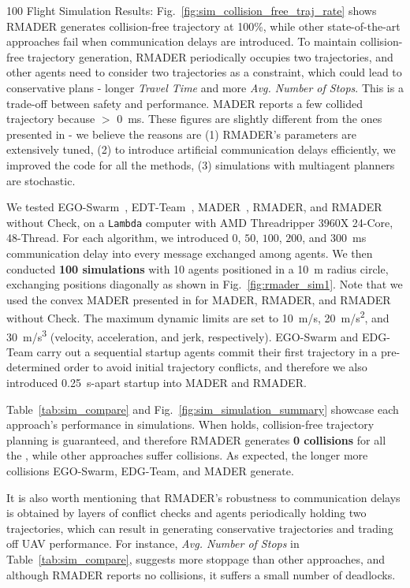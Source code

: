 100 Flight Simulation Results: Fig.~\ref{fig:sim_collision_free_traj_rate} shows RMADER generates collision-free trajectory at 100\%, while other state-of-the-art approaches fail when communication delays are introduced. 
    To maintain collision-free trajectory generation, RMADER periodically occupies two trajectories, and other agents need to consider two trajectories as a constraint, which could lead to conservative plans - longer \emph{Travel Time} and more \emph{Avg. Number of Stops}. 
    This is a trade-off between safety and performance. MADER reports a few collided trajectory because \delayActual{} $>$ \SI{0}{\ms}. These figures are slightly different from the ones presented in \cite{kondo2022robust} - we believe the reasons are (1) RMADER's parameters are extensively tuned, (2) to introduce artificial communication delays efficiently, we improved the code for all the methods, (3) simulations with multiagent planners are stochastic.

We tested EGO-Swarm~\cite{zhou_ego-swarm_2020}, EDT-Team~\cite{hou_enhanced_2022}, MADER~\cite{tordesillas_mader_2022}, RMADER, and RMADER without Check, on a \texttt{Lambda} computer with AMD Threadripper 3960X 24-Core, 48-Thread. 
For each algorithm, we introduced $0$, $50$, $100$, $200$, and \SI{300}{\ms} communication delay into every message exchanged among agents. 
We then conducted \textbf{100 simulations} with 10 agents positioned in a \SI{10}{\m} radius circle, exchanging positions diagonally as shown in Fig.~\ref{fig:rmader_sim1}.
Note that we used the convex MADER presented in \cite{kondo2022robust} for MADER, RMADER, and RMADER without Check.
The maximum dynamic limits are set to \SI{10}{\m/\s}, \SI{20}{\m/\s^2}, and \SI{30}{\m/\s^3} (velocity, acceleration, and jerk, respectively).
EGO-Swarm and EDG-Team carry out a sequential startup \textemdash agents commit their first trajectory in a pre-determined order to avoid initial trajectory conflicts, and therefore we also introduced \SI{0.25}{\second}-apart startup into MADER and RMADER. 

Table~\ref{tab:sim_compare} and Fig.~\ref{fig:sim_simulation_summary} showcase each approach's performance in simulations. 
When \NeccessaryCond{} holds, collision-free trajectory planning is guaranteed, and therefore RMADER generates \textbf{0 collisions} for all the \delayIntroduced{}, while other approaches suffer collisions. 
As expected, the longer \delayIntroduced{} more collisions EGO-Swarm, EDG-Team, and MADER generate.

It is also worth mentioning that RMADER's robustness to communication delays is obtained by layers of conflict checks and agents periodically holding two trajectories, which can result in generating conservative trajectories and trading off UAV performance. 
For instance, \emph{Avg. Number of Stops} in Table~\ref{tab:sim_compare}, suggests more stoppage than other approaches, and although RMADER reports no collisions, it suffers a small number of deadlocks.

